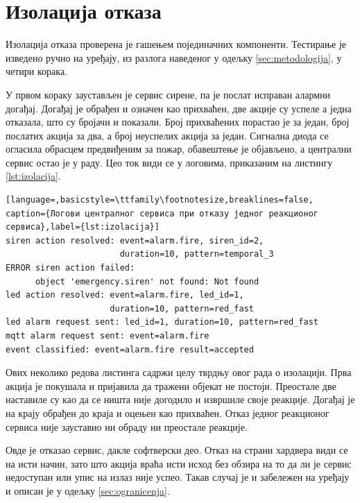 \documentclass[12pt,oneside]{memoir}
\begin{document}
\section{Изолација отказа}
\label{sec:izolacija}

Изолација отказа проверена је гашењем појединачних компоненти. Тестирање је изведено ручно
на уређају, из разлога наведеног у одељку \ref{sec:metodologija}, у четири корака.

У првом кораку заустављен је сервис сирене, па је послат исправан алармни догађај. Догађај
је обрађен и означен као прихваћен, две акције су успеле а једна отказала, што су бројачи и
показали. Број прихваћених порастао је за један, број послатих акција за два, а број
неуспелих акција за један. Сигнална диода се огласила обрасцем предвиђеним за пожар,
обавештење је објављено, а централни сервис остао је у раду. Цео ток види се у логовима, приказаним на
листингу \ref{lst:izolacija}.

\begin{lstlisting}[language=,basicstyle=\ttfamily\footnotesize,breaklines=false,
caption={Логови централног сервиса при отказу једног реакционог сервиса},label={lst:izolacija}]
siren action resolved: event=alarm.fire, siren_id=2,
                       duration=10, pattern=temporal_3
ERROR siren action failed:
      object 'emergency.siren' not found: Not found
led action resolved: event=alarm.fire, led_id=1,
                     duration=10, pattern=red_fast
led alarm request sent: led_id=1, duration=10, pattern=red_fast
mqtt alarm request sent: event=alarm.fire
event classified: event=alarm.fire result=accepted
\end{lstlisting}

Ових неколико редова листинга садржи целу тврдњу овог рада о изолацији. Прва акција је покушала и
пријавила да тражени објекат не постоји. Преостале две наставиле су као да се ништа није
догодило и извршиле своје реакције. Догађај је на крају обрађен до краја и оцењен као
прихваћен. Отказ једног реакционог сервиса није зауставио ни обраду ни преостале реакције.

Овде је отказао сервис, дакле софтверски део. Отказ на страни хардвера види се на исти начин, 
зато што акција враћа исти исход без обзира на то да ли је сервис недоступан или упис на излаз није успео. 
Такав случај је и забележен на уређају и описан је у одељку \ref{sec:ogranicenja}.
\end{document}
